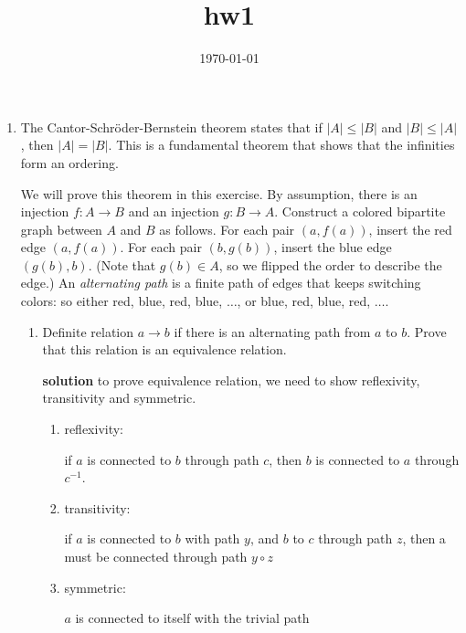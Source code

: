 \documentclass{article}
\title{hw1}
\date{\today}
\begin{document}
\maketitle

\begin{enumerate}
    
    \item The Cantor-Schr\"{o}der-Bernstein theorem states that if $|A| \leq |B|$ and $|B| \leq |A|$, then $|A| = |B|$. This is a fundamental theorem
            that shows that the infinities form an ordering.
    
            We will prove this theorem in this exercise. By assumption, there is an injection $f: A \to B$ and an injection $g: B \to A$. Construct a colored bipartite graph between
            $A$ and $B$ as follows. For each pair $(a, f(a))$, insert the red edge $(a, f(a))$. For each pair $(b, g(b))$, insert
            the blue edge $(g(b), b)$. (Note that $g(b) \in A$, so we flipped the order to describe the edge.) An \emph{alternating path} is 
            a finite path of edges that keeps switching colors: so either red, blue, red, blue, $\ldots$, or blue, red, blue, red, $\ldots$.
            \begin{enumerate}
                \item Definite relation $a \to b$ if there is an alternating path from $a$ to $b$. Prove that this relation is an equivalence relation.
                
                \textbf{solution}
                to prove equivalence relation, we need to show reflexivity, transitivity and symmetric.
    
                \begin{enumerate}
                    \item reflexivity:
                    
                    if \(a\) is connected to \(b\) through path \(c\), then \(b\) is connected to \(a\) through \(c^{-1}\).
    
                    \item transitivity:
                    
                    if \(a\) is connected to \(b\) with path \(y\), and \(b\) to \(c\) through path \(z\), then a must be connected through path \(y\circ z\)

                    \item symmetric:
                    
                    \(a\) is connected to itself with the trivial path
                \end{enumerate}
    

\end{enumerate}
\end{enumerate}
\end{document}
